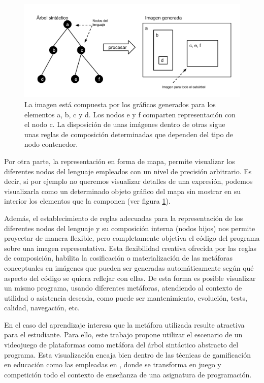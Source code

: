 \documentclass{llncs}
\begin{document}
\begin{figure}[ht]
\begin{center}
\includegraphics[scale=0.5]{images/arbol-mapa.pdf}
\caption{La imagen está compuesta por los gráficos generados para los elementos a, b, c y d. Los nodos e y f comparten representación con el nodo c. La disposición de unas imágenes dentro de otras sigue unas reglas de composición determinadas que dependen del tipo de nodo contenedor.
\label{fig:arbolmapa}}
\end{center}
\end{figure}

Por otra parte, la representación en forma de mapa, permite visualizar los diferentes nodos del lenguaje empleados con un nivel de precisión arbitrario. Es decir, si por ejemplo no queremos visualizar detalles de una expresión, podemos visualizarla como un determinado objeto gráfico del mapa sin mostrar en su interior los elementos que la componen (ver figura \ref{fig:arbolmapa}).

Además, el establecimiento de reglas adecuadas para la representación de los diferentes nodos del lenguaje y su composición interna (nodos hijos) nos permite proyectar de manera flexible, pero completamente objetiva el código del programa sobre una imagen representativa. Esta flexibilidad creativa ofrecida por las reglas de composición, habilita la cosificación o materialización de las metáforas conceptuales \cite{travers1996programming} en imágenes que pueden ser generadas automáticamente según qué aspecto del código se quiera reflejar con ellas. De esta forma es posible visualizar un mismo programa, usando diferentes metáforas, atendiendo al contexto de utilidad o asistencia deseada, como puede ser mantenimiento, evolución, tests, calidad, navegación, etc.

En el caso del aprendizaje interesa que la metáfora utilizada resulte atractiva para el estudiante. Para ello, este trabajo propone utilizar el escenario de un videojuego de plataformas como metáfora del árbol sintáctico abstracto del programa. Esta visualización encaja bien dentro de las técnicas de gamificación en educación como las empleadas en \cite{kumar2012gamification}, donde se transforma en juego y competición todo el contexto de enseñanza de una asignatura de programación. 
\end{document}
